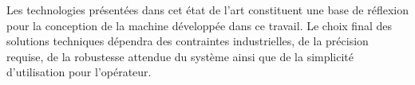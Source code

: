 Les technologies présentées dans cet état de l’art constituent une base de réflexion pour la conception de la machine développée dans ce travail. Le choix final des solutions techniques dépendra des contraintes industrielles, de la précision requise, de la robustesse attendue du système ainsi que de la simplicité d’utilisation pour l’opérateur.